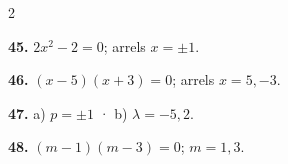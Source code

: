 \documentclass[13pt,a4paper]{extarticle}
\begin{document}
\begin{multicols}{2}
\begin{minipage}{\linewidth}
\end{minipage}\par\vspace{1.6mm}
\par\noindent\begin{minipage}{\linewidth}
\textbf{45.} $2x^2-2=0$; arrels $x=\pm1$.\par
\end{minipage}\par\vspace{1.6mm}
\par\noindent\begin{minipage}{\linewidth}
\textbf{46.} $(x-5)(x+3)=0$; arrels $x=5,-3$.\par
\end{minipage}\par\vspace{1.6mm}
\par\noindent\begin{minipage}{\linewidth}
\textbf{47.} a) $p=\pm1$ · b) $\lambda=-5,2$.\par
\end{minipage}\par\vspace{1.6mm}
\par\noindent\begin{minipage}{\linewidth}
\textbf{48.} $(m-1)(m-3)=0$; $m=1,3$.\par
\end{minipage}\par\vspace{1.6mm}
\end{multicols}
\end{document}
